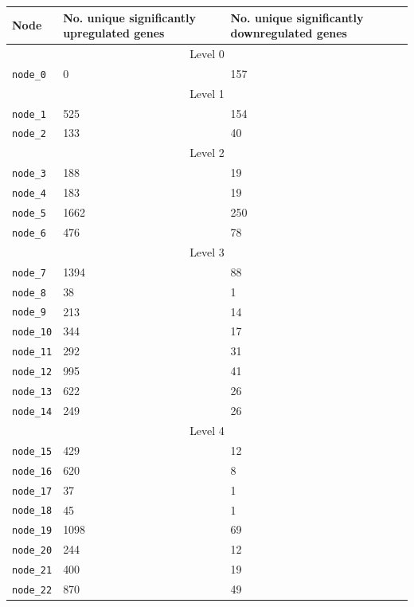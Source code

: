 \begin{table}[]
    \centering
    \begin{tabular}{|p{3cm}||p{4cm}|p{4cm}|}
    \hline
    Node & No. unique significantly upregulated genes & No. unique significantly downregulated genes\\
    \hline
    \multicolumn{3}{|c|}{Level 0}\\
    \hline
        \texttt{node\_0} & 0 & 157 \\
    \hline
    \multicolumn{3}{|c|}{Level 1}\\
    \hline
        \texttt{node\_1} & 525 & 154 \\        \texttt{node\_2} & 133 & 40 \\
    \hline
    \multicolumn{3}{|c|}{Level 2}\\
    \hline
        \texttt{node\_3} & 188 & 19 \\
        \texttt{node\_4} & 183 & 19 \\
        \texttt{node\_5} & 1662 & 250 \\
        \texttt{node\_6} & 476 & 78 \\
    \hline
    \multicolumn{3}{|c|}{Level 3}\\
    \hline
        \texttt{node\_7} & 1394 & 88 \\
        \texttt{node\_8} & 38 & 1 \\
        \texttt{node\_9} & 213 & 14 \\
        \texttt{node\_10} & 344 & 17 \\
        \texttt{node\_11} & 292 & 31 \\
        \texttt{node\_12} & 995 & 41 \\
        \texttt{node\_13} & 622 & 26 \\
        \texttt{node\_14} & 249 & 26 \\
    \hline
    \multicolumn{3}{|c|}{Level 4}\\
    \hline
        \texttt{node\_15} & 429 & 12 \\
        \texttt{node\_16} & 620 & 8 \\
        \texttt{node\_17} & 37 & 1 \\
        \texttt{node\_18} & 45 & 1 \\
        \texttt{node\_19} & 1098 & 69 \\
        \texttt{node\_20} & 244 & 12 \\
        \texttt{node\_21} & 400 & 19 \\
        \texttt{node\_22} & 870 & 49 \\

\end{tabular}
\end{table}
